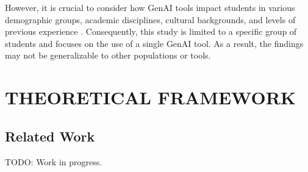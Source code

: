 \documentclass[a4paper,twoside]{article}
\begin{document}
However, it is crucial to consider how GenAI tools impact students in
various demographic groups, academic disciplines, cultural backgrounds, and
levels of previous experience \citep{catalan21} \citep{neo22}. Consequently, this
study is limited to a specific group of students and focuses on the use of a
single GenAI tool. As a result, the findings may not be generalizable to other
populations or tools.




\section{\uppercase{Theoretical Framework}}

\subsection{Related Work}

TODO: Work in progress.

\end{document}
